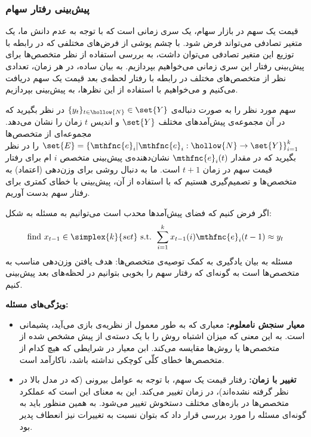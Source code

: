 \subsubsection{
پیش‌بینی رفتار سهام
}


قیمت یک سهم در بازار سهام، یک سری زمانی است که با توجه به عدم دانش ما، یک متغیر تصادفی می‌تواند فرض شود. با چشم پوشی از فرض‌های مختلفی که در رابطه با توزیع این متغیر تصادفی می‌توان داشت، به بررسی استفاده از نظر متخصص‌ها برای پیش‌بینی رفتار این سری زمانی می‌خواهیم بپردازیم. به بیان ساده، در هر زمان، تعدادی نظر از متخصص‌های مختلف در رابطه با رفتار لحظه‌ی بعد قیمت یک سهم دریافت می‌کنیم و می‌خواهیم با استفاده از این نظرها، به پیش‌بینی بپردازیم.

سهم مورد نظر را به صورت دنباله‌ی
$\{ y_t \}_{t \in \hollow{N}} \in \set{Y}$
در نظر بگیرید که در آن مجموعه‌ی پیش‌آمدهای مختلف
$\set{Y}$
و اندیس
$t$
زمان را نشان می‌دهد. مجموعه‌ای از متخصص‌ها
$\set{E} = \left\lbrace \mthfnc{e}_i \vert \mthfnc{e}_i: \hollow{N} \rightarrow \set{Y} \right\rbrace^{k}_{i=1}$
را در نظر بگیرید که در مقدار
$\mthfnc{e}_i(t)$
نشان‌دهنده‌ی پیش‌بینی متخصص
$i$
ام برای رفتار قیمت سهم در زمان
$t+1$
است. ما به دنبال روشی برای وزن‌دهی (اعتماد) به متخصص‌ها و تصمیم‌گیری هستیم که با استفاده از آن، پیش‌بینی با خطای کمتری برای رفتار سهم بدست آوریم.

اگر فرض کنیم که فضای پیش‌آمدها محدب است می‌توانیم به مسئله به شکل:
\[
\mbox{find } x_{t-1} \in \simplex{k}{set} \mbox{ s.t. } \sum^{k}_{i=1} x_{t-1}(i) \mthfnc{e}_i(t-1) \approx y_t
\]
مسئله به بیان یادگیری به کمک توصیه‌ی متخصص‌ها: هدف یافتن وزن‌دهی مناسب به متخصص‌ها است به گونه‌ای که رفتار سهم را بخوبی بتوانیم در لحظه‌های بعد پیش‌بینی کنیم.

\textbf{
ویژگی‌های مسئله:
}
\begin{itemize}
\item\textbf{
معیار سنجش نامعلوم:
}
معیاری که به طور معمول از نظریه‌ی بازی
می‌آید، پشیمانی
است. به این معنی که میزان اشتباه روش را با یک دسته‌ی از پیش مشخص شده از متخصص‌ها یا روش‌ها مقایسه می‌کند. ابن معیار در شرایطی که هیچ کدام از متخصص‌ها خطای کلّی کوچکی نداشته باشد، ناکارآمد است.
\item\textbf{
تغییر با زمان:
}
رفتار قیمت یک سهم، با توجه به عوامل بیرونی (که در مدل بالا در نظر گرفته نشده‌اند)، در زمان تغییر می‌کند. این به معنای این است که عملکرد متخصص‌ها در بازه‌های مختلف دستخوش تغییر می‌شود. به همین منظور باید به گونه‌ای مسئله را مورد بررسی قرار داد که بتوان نسبت به تغییرات نیز انعطاف پدیر بود.
\end{itemize}




